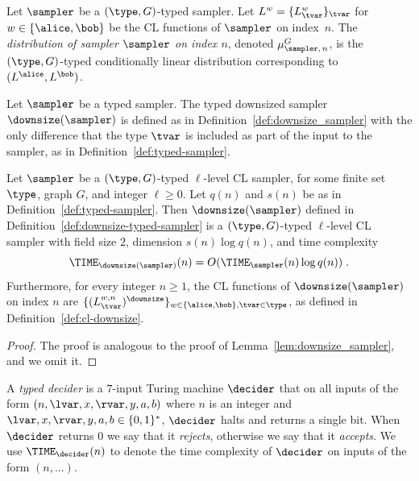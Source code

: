 \begin{definition}
  \label{def:typed-sampler-sample}
  Let $\sampler$ be a $(\type, G)$-typed sampler.
  Let $L^w = \{ L^{w}_{\tvar} \}_\tvar$ for $w\in \{\alice, \bob\}$ be the CL
  functions of $\sampler$ on index~$n$.
  The \emph{distribution of sampler $\sampler$ on index $n$},
  denoted $\mu^G_{\sampler,\, n}$, is the $(\type, G)$-typed conditionally
  linear distribution corresponding to $(L^\alice, L^\bob)$.
\end{definition}

\begin{definition}
  \label{def:downsize-typed-sampler}
Let $\sampler$ be a typed sampler.
  The typed downsized sampler $\downsize(\sampler)$ is defined as in
  Definition~\ref{def:downsize_sampler} with the only difference that the type
  $\tvar$ is included as part of the input to the sampler, as in
  Definition~\ref{def:typed-sampler}.
\end{definition}

\begin{lemma}
  \label{lem:downsize_typed_sampler}
Let $\sampler$ be a $(\type, G)$-typed $\ell$-level CL sampler, for some finite set
  $\type$, graph $G$,  and integer $\ell\geq 0$.
  Let $q(n)$ and $s(n)$ be as in Definition~\ref{def:typed-sampler}.
  Then $\downsize(\sampler)$ defined in
  Definition~\ref{def:downsize-typed-sampler} is a $(\type, G)$-typed $\ell$-level CL
  sampler with field size $2$, dimension $s(n) \log q(n)$, and
  time complexity
  \begin{equation*}
    \TIME_{\downsize(\sampler)}(n) = O(\TIME_\sampler(n) \log q(n))\;.
  \end{equation*}
  Furthermore, for every integer $n \geq 1$, the CL functions of
  $\downsize(\sampler)$ on index $n$ are
  $\{(L_\tvar^{w,n})^\downsize\}_{w\in\{\alice,\bob\}, \tvar\in\type}$, as
  defined in Definition~\ref{def:cl-downsize}.
\end{lemma}

\begin{proof}
  The proof is analogous to the proof of Lemma~\ref{lem:downsize_sampler}, and
  we omit it.
\end{proof}

\begin{definition}
  \label{def:typed-decider}
  A \emph{typed decider} is a $7$-input Turing machine $\decider$ that on all
  inputs of the form $(n,\lvar,x,\rvar,y,a,b)$ where $n$ is an integer and
  $\lvar,x,\rvar,y,a,b \in \{0,1\}^*$, $\decider$ halts and returns a single
  bit.
  When $\decider$ returns $0$ we say that it \emph{rejects}, otherwise we say
  that it \emph{accepts}.
  We use $\TIME_\decider(n)$ to denote the time complexity of $\decider$ on
  inputs of the form $(n,\ldots)$.
\end{definition}

